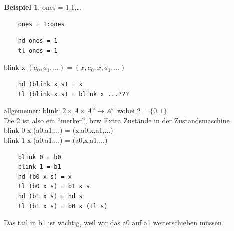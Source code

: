 \documentclass{article}
\theoremstyle{definition}
\newtheorem{beispiel}{Beispiel}[section]
\begin{document}
	\begin{beispiel} ones = 1,1,\dots\\
	\begin{verbatim}
	ones = 1:ones
	\end{verbatim}
	\begin{verbatim}
	hd ones = 1
	tl ones = 1
	\end{verbatim}
	blink x $(a_0,a_1,\dots) = (x,a_0,x,a_1,\dots)$\\
	\begin{verbatim}
	hd (blink x s) = x
	tl (blink x s) = blink x ...???
	\end{verbatim}
	allgemeiner: blink: $2\times A\times A^\omega\to A^\omega$ wobei $2=\{0,1\}$\\
	Die 2 ist also ein ``merker'', bzw Extra Zustände in der Zustandsmaschine\\
	blink 0 x (a0,a1,...) = (x,a0,x,a1,...)\\
	blink 1 x (a0,a1,...) = (a0,x,a1,...)
	\begin{verbatim}
	blink 0 = b0
	blink 1 = b1
	hd (b0 x s) = x
	tl (b0 x s) = b1 x s
	hd (b1 x s) = hd s
	tl (b1 x s) = b0 x (tl s)
	\end{verbatim}
	Das tail in b1 ist wichtig, weil wir das a0 auf a1 weiterschieben müssen\\
	\end{beispiel}
\end{document}
